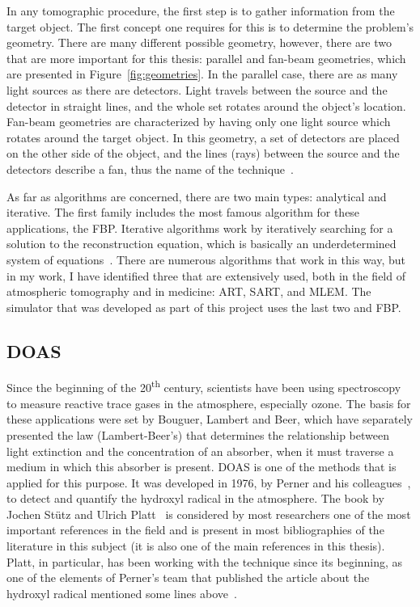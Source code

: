In any tomographic procedure, the first step is to gather information
from the target object. The first concept one requires for this is to
determine the problem's geometry. There are many different possible
geometry, however, there are two that are more important for this
thesis: parallel and fan-beam geometries, which are presented in
Figure~\ref{fig:geometries}. In the parallel case, there are as many
light sources as there are detectors. Light travels between the source
and the detector in straight lines, and the whole set rotates around the
object's location. Fan-beam geometries are characterized by having only
one light source which rotates around the target object. In this
geometry, a set of detectors are placed on the other side of the object,
and the lines (rays) between the source and the detectors describe a
fan, thus the name of the technique~\cite{Herman2009, Kak2001}.

As far as algorithms are concerned, there are two main types: analytical
and iterative. The first family includes the most famous algorithm for
these applications, the \gls{FBP}. Iterative algorithms work by iteratively
searching for a solution to the reconstruction equation, which is
basically an underdetermined system of equations~.
There are numerous algorithms that work in this way, but in my work, I
have identified three that are extensively used, both in the field of
atmospheric tomography and in medicine: \gls{ART}, \gls{SART}, and
\gls{MLEM}. The simulator that was developed as part of this project
uses the last two and \gls{FBP}.

\subsection{\gls{DOAS}}%
\label{sub:doas}

Since the beginning of the 20\textsuperscript{th} century, scientists
have been using spectroscopy to measure reactive trace gases in the
atmosphere, especially ozone. The basis for these applications were set
by Bouguer, Lambert and Beer, which have separately presented the law
(Lambert-Beer's) that determines the relationship between light
extinction and the concentration of an absorber, when it must traverse a
medium in which this absorber is present. \gls{DOAS} is one of the
methods that is applied for this purpose. It was developed in 1976, by
Perner and his colleagues~\cite{Perner1976}, to detect and quantify the
hydroxyl radical in the atmosphere. The book by Jochen Stütz and Ulrich
Platt~\cite{Platt2007} is considered by most researchers one of the most
important references in the field and is present in most bibliographies
of the literature in this subject (it is also one of the main references
in this thesis). Platt, in particular, has been working with the
technique since its beginning, as one of the elements of Perner's team
that published the article about the hydroxyl radical mentioned some
lines above~\cite{Perner1976}.

